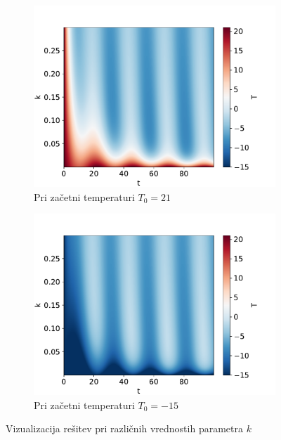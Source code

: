 \documentclass{article}
\begin{document}
\begin{figure}[H]
    \centering
    \begin{subfigure}{0.49\textwidth}
        \centering
        \includegraphics[width=\linewidth]{family21.01.pdf}
		\caption{Pri začetni temperaturi $T_0=21$}
        \label{fig:image1}
    \end{subfigure}
    \hfill
    \begin{subfigure}{0.49\textwidth}
        \centering
		\includegraphics[width=\linewidth]{family-15.01.pdf}
		\caption{Pri začetni temperaturi $T_0=-15$}
        \label{fig:image2}
    \end{subfigure}
	\caption{Vizualizacija rešitev pri različnih vrednostih parametra $k$}
\end{figure}
\end{document}
